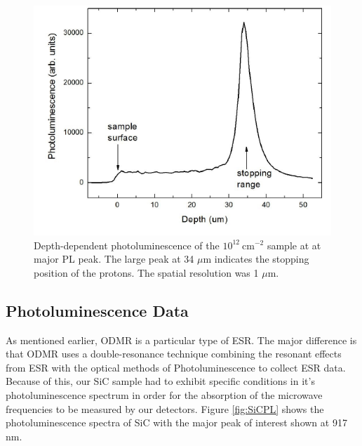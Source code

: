 \documentclass[oneside, noacknowlegments]{BYUPhys}
\begin{document}
\begin{figure}
    \centerline{\includegraphics{srim_fig}}
    \caption[SiC Depth-Dependent Photoluminescence]{\label{fig:SiCDepth}
     Depth-dependent photoluminescence of the $10^{12}~\text{cm}^{−2}$ sample at at major PL peak. The large peak at 34 $\mu$m indicates the stopping position of the protons. The spatial resolution was 1 $\mu$m.}
 \end{figure}

\subsection{Photoluminescence Data}

As mentioned earlier, ODMR is a particular type of ESR. The major difference is that ODMR uses a double-resonance technique combining the resonant effects from ESR with the optical methods of Photoluminescence to collect ESR data. Because of this, our SiC sample had to exhibit specific conditions in it's photoluminescence spectrum in order for the absorption of the microwave frequencies to be measured by our detectors. Figure \ref{fig:SiCPL} shows the photoluminescence spectra of SiC with the major peak of interest shown at 917 nm.
\end{document}
